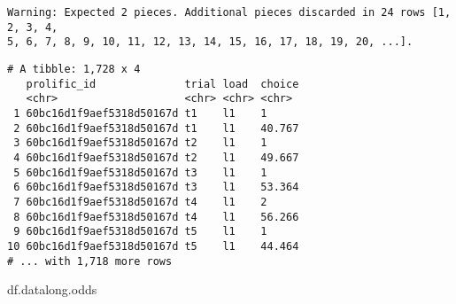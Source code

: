 \documentclass[
]{article}
\newenvironment{Shaded}{\begin{snugshade}}{\end{snugshade}}
\newcommand{\DecValTok}[1]{\textcolor[rgb]{0.00,0.00,0.81}{#1}}
\newcommand{\DocumentationTok}[1]{\textcolor[rgb]{0.56,0.35,0.01}{\textbf{\textit{#1}}}}
\newcommand{\FunctionTok}[1]{\textcolor[rgb]{0.00,0.00,0.00}{#1}}
\newcommand{\NormalTok}[1]{#1}
\newcommand{\OtherTok}[1]{\textcolor[rgb]{0.56,0.35,0.01}{#1}}
\newcommand{\SpecialCharTok}[1]{\textcolor[rgb]{0.00,0.00,0.00}{#1}}
\newcommand{\StringTok}[1]{\textcolor[rgb]{0.31,0.60,0.02}{#1}}
\begin{document}
\begin{verbatim}
Warning: Expected 2 pieces. Additional pieces discarded in 24 rows [1, 2, 3, 4,
5, 6, 7, 8, 9, 10, 11, 12, 13, 14, 15, 16, 17, 18, 19, 20, ...].
\end{verbatim}

\begin{Shaded}
\end{Shaded}

\begin{verbatim}
# A tibble: 1,728 x 4
   prolific_id              trial load  choice
   <chr>                    <chr> <chr> <chr> 
 1 60bc16d1f9aef5318d50167d t1    l1    1     
 2 60bc16d1f9aef5318d50167d t1    l1    40.767
 3 60bc16d1f9aef5318d50167d t2    l1    1     
 4 60bc16d1f9aef5318d50167d t2    l1    49.667
 5 60bc16d1f9aef5318d50167d t3    l1    1     
 6 60bc16d1f9aef5318d50167d t3    l1    53.364
 7 60bc16d1f9aef5318d50167d t4    l1    2     
 8 60bc16d1f9aef5318d50167d t4    l1    56.266
 9 60bc16d1f9aef5318d50167d t5    l1    1     
10 60bc16d1f9aef5318d50167d t5    l1    44.464
# ... with 1,718 more rows
\end{verbatim}

\begin{Shaded}
\begin{Highlighting}[]
\NormalTok{df.datalong.odds}
\end{Highlighting}
\end{Shaded}
\end{document}
